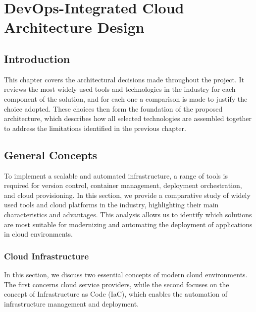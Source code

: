 \chapter{DevOps-Integrated Cloud Architecture Design}
\minitoc
\newpage

\setcounter{secnumdepth}{0} %
\section{Introduction}
This chapter covers the architectural decisions made throughout the project. 
It reviews the most widely used tools and technologies in the industry for 
each component of the solution, and for each one a comparison is made to 
justify the choice adopted. These choices then form the foundation of the 
proposed architecture, which describes how all selected technologies are 
assembled together to address the limitations identified in the previous chapter.

\setcounter{secnumdepth}{2} %
\section{General Concepts}
To implement a scalable and automated infrastructure, a range of tools is
required for version control, container management, deployment orchestration,
and cloud provisioning. In this section, we provide a comparative study of
widely used tools and cloud platforms in the industry, highlighting their
main characteristics and advantages. This analysis allows us to identify
which solutions are most suitable for modernizing and automating the
deployment of applications in cloud environments.

\subsection{Cloud Infrastructure}
In this section, we discuss two essential concepts of modern cloud environments. 
The first concerns cloud service providers, while the second focuses on the concept 
of Infrastructure as Code (IaC), which enables the automation of infrastructure 
management and deployment.

